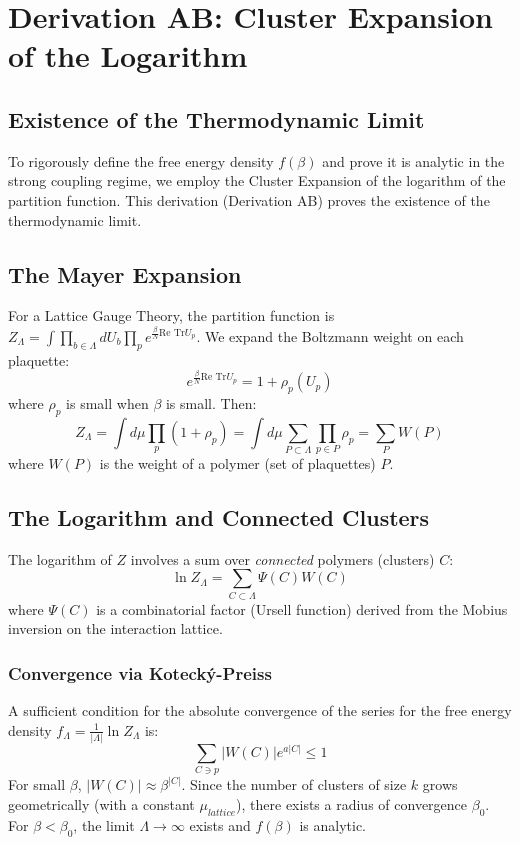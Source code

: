 \chapter{Derivation AB: Cluster Expansion of the Logarithm}
\label{ch:derivation_ab_cluster_expansion}

\section{Existence of the Thermodynamic Limit}

To rigorously define the free energy density $f(\beta)$ and prove it is analytic in the strong coupling regime, we employ the Cluster Expansion of the logarithm of the partition function. This derivation (Derivation AB) proves the existence of the thermodynamic limit.

\section{The Mayer Expansion}

For a Lattice Gauge Theory, the partition function is $Z_\Lambda = \int \prod_{b \in \Lambda} dU_b \prod_{p} e^{\frac{\beta}{N} \text{Re Tr} U_p}$.
We expand the Boltzmann weight on each plaquette:
\begin{equation}
e^{\frac{\beta}{N} \text{Re Tr} U_p} = 1 + \rho_p(U_p)
\end{equation}
where $\rho_p$ is small when $\beta$ is small.
Then:
\begin{equation}
Z_\Lambda = \int d\mu \prod_p (1 + \rho_p) = \int d\mu \sum_{P \subset \Lambda} \prod_{p \in P} \rho_p = \sum_{P} W(P)
\end{equation}
where $W(P)$ is the weight of a polymer (set of plaquettes) $P$.

\section{The Logarithm and Connected Clusters}

The logarithm of $Z$ involves a sum over \textit{connected} polymers (clusters) $C$:
\begin{equation}
\ln Z_\Lambda = \sum_{C \subset \Lambda} \Psi(C) W(C)
\end{equation}
where $\Psi(C)$ is a combinatorial factor (Ursell function) derived from the Mobius inversion on the interaction lattice.

\subsection{Convergence via Kotecký-Preiss}
A sufficient condition for the absolute convergence of the series for the free energy density $f_\Lambda = \frac{1}{|\Lambda|} \ln Z_\Lambda$ is:
\begin{equation}
\sum_{C \ni p} |W(C)| e^{a |C|} \le 1
\end{equation}
For small $\beta$, $|W(C)| \approx \beta^{|C|}$. Since the number of clusters of size $k$ grows geometrically (with a constant $\mu_{lattice}$), there exists a radius of convergence $\beta_0$.
For $\beta < \beta_0$, the limit $\Lambda \to \infty$ exists and $f(\beta)$ is analytic.

